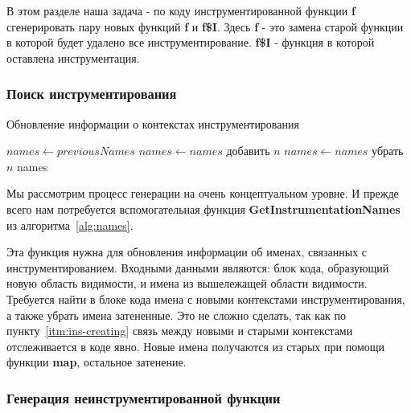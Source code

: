 В этом разделе наша задача - по коду инструментированной функции \textbf{f}
сгенерировать пару новых функций \textbf{f} и \textbf{f\$I}.
Здесь \textbf{f} - это замена старой функции в которой будет удалено
все инструментирование.
\textbf{f\$I} - функция в которой оставлена инструментация.

\subsubsection{Поиск инструментирования}

\begin{algorithm}
  \caption{Обновление информации о контекстах инструментирования}\label{alg:names}
  \begin{algorithmic}[1]
    \State $names \gets previousNames$
    \State $names \gets names$ добавить $n$
    \State $names \gets names$ убрать $n$
    \EndIf
    \EndFor
    \State \Return names
    \EndFunction
  \end{algorithmic}
\end{algorithm}

Мы рассмотрим процесс генерации на очень концептуальном уровне.
И прежде всего нам потребуется вспомогательная функция
\textbf{GetInstrumentationNames} из алгоритма~\ref{alg:names}.

Эта функция нужна для обновления информации об именах, связанных с
инструментированием.
Входными данными являются: блок кода, образующий новую область видимости, и
имена из вышележащей области видимости.
Требуется найти в блоке кода имена с новыми контекстами инструментирования,
а также убрать имена затененные.
Это не сложно сделать, так как по пункту~\ref{itm:ins-creating} связь между
новыми и старыми контекстами отслеживается в коде явно.
Новые имена получаются из старых при помощи функции \textbf{map},
остальное затенение.

\subsubsection{Генерация неинструментированной функции}

